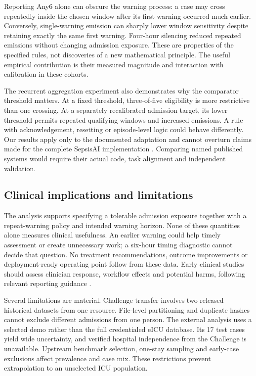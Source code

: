 \documentclass[preprint,12pt]{elsarticle}
\newcommand{\anysix}{Any6}
\begin{document}
Reporting \anysix{} alone can obscure the warning process: a case may cross repeatedly inside the chosen window after its first warning occurred much earlier. Conversely, single-warning emission can sharply lower window sensitivity despite retaining exactly the same first warning. Four-hour silencing reduced repeated emissions without changing admission exposure. These are properties of the specified rules, not discoveries of a new mathematical principle. The useful empirical contribution is their measured magnitude and interaction with calibration in these cohorts.

The recurrent aggregation experiment also demonstrates why the comparator threshold matters. At a fixed threshold, three-of-five eligibility is more restrictive than one crossing. At a separately recalibrated admission target, its lower threshold permits repeated qualifying windows and increased emissions. A rule with acknowledgement, resetting or episode-level logic could behave differently. Our results apply only to the documented adaptation and cannot overturn claims made for the complete SepsisAI implementation \cite{gupta}. Comparing named published systems would require their actual code, task alignment and independent validation.

\subsection{Clinical implications and limitations}
The analysis supports specifying a tolerable admission exposure together with a repeat-warning policy and intended warning horizon. None of these quantities alone measures clinical usefulness. An earlier warning could help timely assessment or create unnecessary work; a six-hour timing diagnostic cannot decide that question. No treatment recommendations, outcome improvements or deployment-ready operating point follow from these data. Early clinical studies should assess clinician response, workflow effects and potential harms, following relevant reporting guidance \cite{decideai}.

Several limitations are material. Challenge transfer involves two released historical datasets from one resource. File-level partitioning and duplicate hashes cannot exclude different admissions from one person. The external analysis uses a selected demo rather than the full credentialed eICU database. Its 17 test cases yield wide uncertainty, and verified hospital independence from the Challenge is unavailable. Upstream benchmark selection, one-stay sampling and early-case exclusions affect prevalence and case mix. These restrictions prevent extrapolation to an unselected ICU population.
\end{document}
